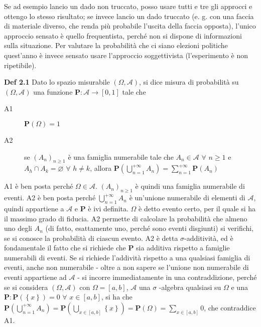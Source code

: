 \documentclass{article}
\begin{document}
Se ad esempio lancio un dado non truccato, posso usare tutti e tre gli
approcci e ottengo lo stesso risultato; se invece lancio un dado truccato
(e. g. con una faccia di materiale diverso, che renda pi\`{u} probabile
l'uscita della faccia opposta), l'unico approccio sensato \`{e} quello
frequentista, perch\'{e} non si dispone di informazioni sulla situazione.
Per valutare la probabilit\`{a} che ci siano elezioni politiche quest'anno 
\`{e} invece sensato usare l'approccio soggettivista (l'esperimento \`{e}
non ripetibile).

\textbf{Def 2.1} Dato lo spazio misurabile $\left( \Omega ,\mathcal{A}%
\right) $, si dice misura di probabilit\`{a} su $\left( \Omega ,\mathcal{A}%
\right) $ una funzione $\mathbf{P}:\mathcal{A}\rightarrow \left[ 0,1\right] $
tale che

\begin{description}
\item[A1] $\mathbf{P}\left( \Omega \right) =1$

\item[A2] se $\left( A_{n}\right) _{n\geq 1}$ \`{e} una famiglia numerabile tale che $%
A_{n}\in \mathcal{A}$ $\forall $ $n\geq 1$ e $A_{h}\cap A_{k}=\varnothing $ 
$\forall $ $h\neq k$, allora $\mathbf{P}\left( \bigcup_{n=1}^{+\infty }A_{n}\right)
=\sum_{n=1}^{+\infty }\mathbf{P}\left( A_{n}\right) $
\end{description}

A1 \`{e} ben posta perch\'{e} $\Omega \in \mathcal{A}$. $\left( A_{n}\right)
_{n\geq 1}$ \`{e} quindi una famiglia numerabile di eventi. A2 \`{e} ben
posta perch\'{e} $\bigcup_{n=1}^{+\infty }A_{n}$ \`{e} un'unione numerabile
di elementi di $\mathcal{A}$, quindi appartiene a $\mathcal{A}$ e $\mathbf{P}
$ \`{e} ivi definita. $\Omega $ \`{e} detto evento certo, per il quale si ha
il massimo grado di fiducia. A2 permette di calcolare la probabilit\`{a} che
almeno uno degli $A_{n}$ (di fatto, esattamente uno, perch\'{e} sono eventi
disgiunti) si verifichi, se si conosce la probabilit\`{a} di ciascun evento.
A2 \`{e} detta $\sigma $-additivit\`{a}, ed \`{e} fondamentale il fatto che
si richiede che $\mathbf{P}$ sia additiva rispetto a famiglie numerabili di
eventi. Se si richiede l'addivit\`{a} rispetto a una qualsiasi famiglia di
eventi, anche non numerabile - oltre a non sapere se l'unione non numerabile
di eventi appartiene ad $\mathcal{A}$ - si incorre immediatamente in una
contraddizione, perch\'{e} se si considera $\left( \Omega ,\mathcal{A}%
\right) $ con $\Omega =\left[ a,b\right] $, $\mathcal{A}$ una $\sigma $%
-algebra qualsiasi su $\Omega $ e una $\mathbf{P:P}\left( \left\{ x\right\}
\right) =0$ $\forall $ $x\in \left[ a,b\right] $, si ha che $\mathbf{P}%
\left( \bigcup_{n=1}^{+\infty }A_{n}\right) =\mathbf{P}\left( \bigcup_{x\in %
\left[ a,b\right] }\left\{ x\right\} \right) =\mathbf{P}\left( \Omega
\right) =\sum_{x\in \left[ a,b\right] }0$, che contraddice A1.
\end{document}
